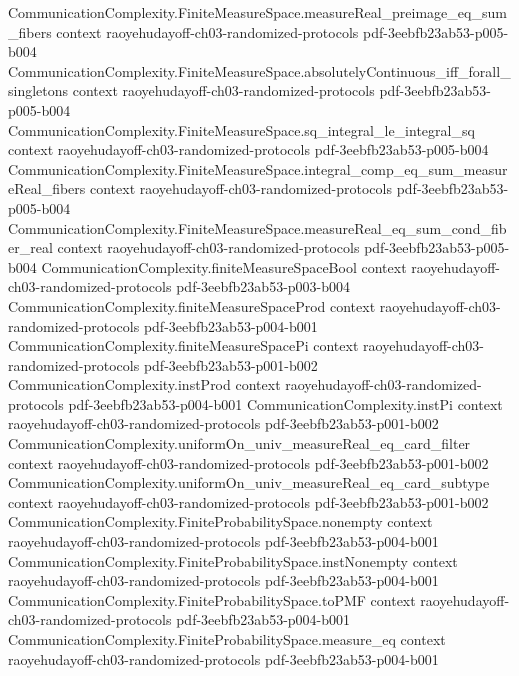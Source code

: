 \begin{theorem}
\proofstep
  {CommunicationComplexity.FiniteMeasureSpace.measureReal_preimage_eq_sum_fibers}
  {context}
  {raoyehudayoff-ch03-randomized-protocols}
  {pdf-3eebfb23ab53-p005-b004}
\proofstep
  {CommunicationComplexity.FiniteMeasureSpace.absolutelyContinuous_iff_forall_singletons}
  {context}
  {raoyehudayoff-ch03-randomized-protocols}
  {pdf-3eebfb23ab53-p005-b004}
\proofstep
  {CommunicationComplexity.FiniteMeasureSpace.sq_integral_le_integral_sq}
  {context}
  {raoyehudayoff-ch03-randomized-protocols}
  {pdf-3eebfb23ab53-p005-b004}
\proofstep
  {CommunicationComplexity.FiniteMeasureSpace.integral_comp_eq_sum_measureReal_fibers}
  {context}
  {raoyehudayoff-ch03-randomized-protocols}
  {pdf-3eebfb23ab53-p005-b004}
\proofstep
  {CommunicationComplexity.FiniteMeasureSpace.measureReal_eq_sum_cond_fiber_real}
  {context}
  {raoyehudayoff-ch03-randomized-protocols}
  {pdf-3eebfb23ab53-p005-b004}
\proofstep
  {CommunicationComplexity.finiteMeasureSpaceBool}
  {context}
  {raoyehudayoff-ch03-randomized-protocols}
  {pdf-3eebfb23ab53-p003-b004}
\proofstep
  {CommunicationComplexity.finiteMeasureSpaceProd}
  {context}
  {raoyehudayoff-ch03-randomized-protocols}
  {pdf-3eebfb23ab53-p004-b001}
\proofstep
  {CommunicationComplexity.finiteMeasureSpacePi}
  {context}
  {raoyehudayoff-ch03-randomized-protocols}
  {pdf-3eebfb23ab53-p001-b002}
\proofstep
  {CommunicationComplexity.instProd}
  {context}
  {raoyehudayoff-ch03-randomized-protocols}
  {pdf-3eebfb23ab53-p004-b001}
\proofstep
  {CommunicationComplexity.instPi}
  {context}
  {raoyehudayoff-ch03-randomized-protocols}
  {pdf-3eebfb23ab53-p001-b002}
\proofstep
  {CommunicationComplexity.uniformOn_univ_measureReal_eq_card_filter}
  {context}
  {raoyehudayoff-ch03-randomized-protocols}
  {pdf-3eebfb23ab53-p001-b002}
\proofstep
  {CommunicationComplexity.uniformOn_univ_measureReal_eq_card_subtype}
  {context}
  {raoyehudayoff-ch03-randomized-protocols}
  {pdf-3eebfb23ab53-p001-b002}
\proofstep
  {CommunicationComplexity.FiniteProbabilitySpace.nonempty}
  {context}
  {raoyehudayoff-ch03-randomized-protocols}
  {pdf-3eebfb23ab53-p004-b001}
\proofstep
  {CommunicationComplexity.FiniteProbabilitySpace.instNonempty}
  {context}
  {raoyehudayoff-ch03-randomized-protocols}
  {pdf-3eebfb23ab53-p004-b001}
\proofstep
  {CommunicationComplexity.FiniteProbabilitySpace.toPMF}
  {context}
  {raoyehudayoff-ch03-randomized-protocols}
  {pdf-3eebfb23ab53-p004-b001}
\proofstep
  {CommunicationComplexity.FiniteProbabilitySpace.measure_eq}
  {context}
  {raoyehudayoff-ch03-randomized-protocols}
  {pdf-3eebfb23ab53-p004-b001}
\proofstep

\end{theorem}
